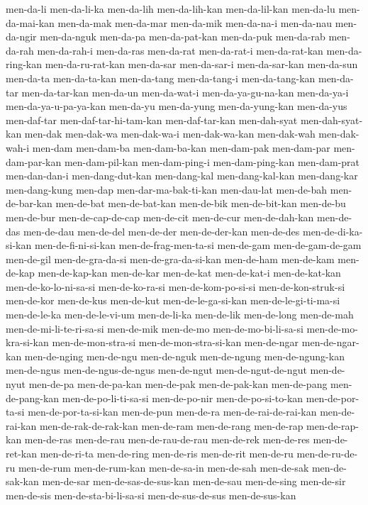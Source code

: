 {men-da-li men-da-li-ka men-da-lih men-da-lih-kan men-da-lil-kan men-da-lu
men-da-mai-kan men-da-mak men-da-mar men-da-mik men-da-na-i men-da-nau
men-da-ngir men-da-nguk men-da-pa men-da-pat-kan men-da-puk men-da-rab
men-da-rah men-da-rah-i men-da-ras men-da-rat men-da-rat-i men-da-rat-kan
men-da-ring-kan men-da-ru-rat-kan men-da-sar men-da-sar-i men-da-sar-kan
men-da-sun men-da-ta men-da-ta-kan men-da-tang men-da-tang-i
men-da-tang-kan men-da-tar men-da-tar-kan men-da-un men-da-wat-i
men-da-ya-gu-na-kan men-da-ya-i men-da-ya-u-pa-ya-kan men-da-yu
men-da-yung men-da-yung-kan men-da-yus men-daf-tar men-daf-tar-hi-tam-kan
men-daf-tar-kan men-dah-syat men-dah-syat-kan men-dak men-dak-wa
men-dak-wa-i men-dak-wa-kan men-dak-wah men-dak-wah-i men-dam men-dam-ba
men-dam-ba-kan men-dam-pak men-dam-par men-dam-par-kan men-dam-pil-kan
men-dam-ping-i men-dam-ping-kan men-dam-prat men-dan-dan-i
men-dang-dut-kan men-dang-kal men-dang-kal-kan men-dang-kar men-dang-kung
men-dap men-dar-ma-bak-ti-kan men-dau-lat men-de-bah men-de-bar-kan
men-de-bat men-de-bat-kan men-de-bik men-de-bit-kan men-de-bu men-de-bur
men-de-cap-de-cap men-de-cit men-de-cur men-de-dah-kan men-de-das
men-de-dau men-de-del men-de-der men-de-der-kan men-de-des
men-de-di-ka-si-kan men-de-fi-ni-si-kan men-de-frag-men-ta-si men-de-gam
men-de-gam-de-gam men-de-gil men-de-gra-da-si men-de-gra-da-si-kan
men-de-ham men-de-kam men-de-kap men-de-kap-kan men-de-kar men-de-kat
men-de-kat-i men-de-kat-kan men-de-ko-lo-ni-sa-si men-de-ko-ra-si
men-de-kom-po-si-si men-de-kon-struk-si men-de-kor men-de-kus men-de-kut
men-de-le-ga-si-kan men-de-le-gi-ti-ma-si men-de-le-ka men-de-le-vi-um
men-de-li-ka men-de-lik men-de-long men-de-mah men-de-mi-li-te-ri-sa-si
men-de-mik men-de-mo men-de-mo-bi-li-sa-si men-de-mo-kra-si-kan
men-de-mon-stra-si men-de-mon-stra-si-kan men-de-ngar men-de-ngar-kan
men-de-nging men-de-ngu men-de-nguk men-de-ngung men-de-ngung-kan
men-de-ngus men-de-ngus-de-ngus men-de-ngut men-de-ngut-de-ngut
men-de-nyut men-de-pa men-de-pa-kan men-de-pak men-de-pak-kan men-de-pang
men-de-pang-kan men-de-po-li-ti-sa-si men-de-po-nir men-de-po-si-to-kan
men-de-por-ta-si men-de-por-ta-si-kan men-de-pun men-de-ra
men-de-rai-de-rai-kan men-de-rai-kan men-de-rak-de-rak-kan men-de-ram
men-de-rang men-de-rap men-de-rap-kan men-de-ras men-de-rau
men-de-rau-de-rau men-de-rek men-de-res men-de-ret-kan men-de-ri-ta
men-de-ring men-de-ris men-de-rit men-de-ru men-de-ru-de-ru men-de-rum
men-de-rum-kan men-de-sa-in men-de-sah men-de-sak men-de-sak-kan
men-de-sar men-de-sas-de-sus-kan men-de-sau men-de-sing men-de-sir
men-de-sis men-de-sta-bi-li-sa-si men-de-sus-de-sus men-de-sus-kan
}

